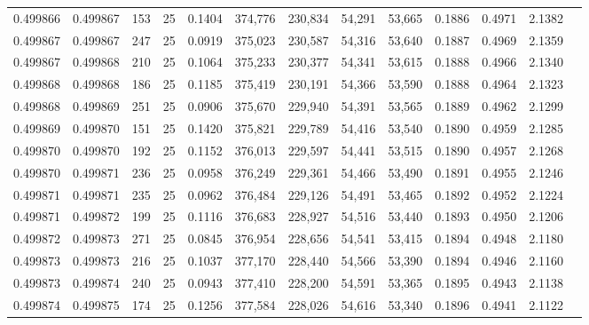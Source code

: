 \begin{tabular}{rrrrrrrrrrrrr}
0.499866 & 0.499867 & 153 &  25 &                                     0.1404 & 374,776 & 230,834 &  54,291 &  53,665 & 0.1886 & 0.4971 & 2.1382 \\
0.499867 & 0.499867 & 247 &  25 &                                     0.0919 & 375,023 & 230,587 &  54,316 &  53,640 & 0.1887 & 0.4969 & 2.1359 \\
0.499867 & 0.499868 & 210 &  25 &                                     0.1064 & 375,233 & 230,377 &  54,341 &  53,615 & 0.1888 & 0.4966 & 2.1340 \\
0.499868 & 0.499868 & 186 &  25 &                                     0.1185 & 375,419 & 230,191 &  54,366 &  53,590 & 0.1888 & 0.4964 & 2.1323 \\
0.499868 & 0.499869 & 251 &  25 &                                     0.0906 & 375,670 & 229,940 &  54,391 &  53,565 & 0.1889 & 0.4962 & 2.1299 \\
0.499869 & 0.499870 & 151 &  25 &                                     0.1420 & 375,821 & 229,789 &  54,416 &  53,540 & 0.1890 & 0.4959 & 2.1285 \\
0.499870 & 0.499870 & 192 &  25 &                                     0.1152 & 376,013 & 229,597 &  54,441 &  53,515 & 0.1890 & 0.4957 & 2.1268 \\
0.499870 & 0.499871 & 236 &  25 &                                     0.0958 & 376,249 & 229,361 &  54,466 &  53,490 & 0.1891 & 0.4955 & 2.1246 \\
0.499871 & 0.499871 & 235 &  25 &                                     0.0962 & 376,484 & 229,126 &  54,491 &  53,465 & 0.1892 & 0.4952 & 2.1224 \\
0.499871 & 0.499872 & 199 &  25 &                                     0.1116 & 376,683 & 228,927 &  54,516 &  53,440 & 0.1893 & 0.4950 & 2.1206 \\
0.499872 & 0.499873 & 271 &  25 &                                     0.0845 & 376,954 & 228,656 &  54,541 &  53,415 & 0.1894 & 0.4948 & 2.1180 \\
0.499873 & 0.499873 & 216 &  25 &                                     0.1037 & 377,170 & 228,440 &  54,566 &  53,390 & 0.1894 & 0.4946 & 2.1160 \\
0.499873 & 0.499874 & 240 &  25 &                                     0.0943 & 377,410 & 228,200 &  54,591 &  53,365 & 0.1895 & 0.4943 & 2.1138 \\
0.499874 & 0.499875 & 174 &  25 &                                     0.1256 & 377,584 & 228,026 &  54,616 &  53,340 & 0.1896 & 0.4941 & 2.1122 \\

\end{tabular}
